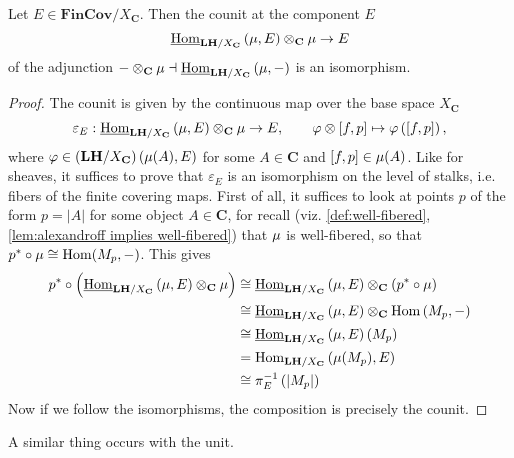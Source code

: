 \begin{proposition*}
\label{prop:the counit of the adjunction is an isomorphism}
Let $E \in \mathbf{FinCov}/X_{\mathbf{C}}$. Then the counit at the component $E$
\[ \underline{\operatorname{Hom}}_{\mathbf{LH}/X_{\mathbf{C}}}\left(\operatorname{\mu}, E\right) \otimes_{\mathbf{C}} \operatorname{\mu} \to E \]
of the adjunction $- \otimes_{\mathbf{C}} \operatorname{\mu} \dashv \underline{\operatorname{Hom}}_{\mathbf{LH}/X_{\mathbf{C}}}\left(\operatorname{\mu},-\right)$ is an isomorphism.
\end{proposition*}
\begin{proof}
The counit is given by the continuous map over the base space $X_{\mathbf{C}}$
\[ \varepsilon_E : \underline{\operatorname{Hom}}_{\mathbf{LH}/X_{\mathbf{C}}}\left(\operatorname{\mu}, E\right) \otimes_{\mathbf{C}} \operatorname{\mu} \to E, \qquad \varphi \otimes [f,p] \mapsto \varphi\left([f,p]\right), \]
where $\varphi \in \left(\mathbf{LH}/X_{\mathbf{C}}\right)(\operatorname{\mu}(A),E)$ for some $A \in \mathbf{C}$ and $[f,p] \in \operatorname{\mu}(A)$. Like for sheaves, it suffices to prove that $\varepsilon_E$ is an isomorphism on the level of stalks, i.e. fibers of the finite covering maps. First of all, it suffices to look at points $p$ of the form $p = |A|$ for some object $A \in \mathbf{C}$, for recall (viz. \cref{def:well-fibered}, \cref{lem:alexandroff implies well-fibered}) that $\operatorname{\mu}$ is well-fibered, so that $p^* \circ \operatorname{\mu} \cong \operatorname{Hom}(M_p,-)$. This gives
\begin{align*}
p^* \circ \left( \underline{\operatorname{Hom}}_{\mathbf{LH}/X_{\mathbf{C}}}\left(\operatorname{\mu}, E\right) \otimes_{\mathbf{C}} \operatorname{\mu} \right) 
&\cong \underline{\operatorname{Hom}}_{\mathbf{LH}/X_{\mathbf{C}}}\left(\operatorname{\mu}, E\right) \otimes_{\mathbf{C}} \left( p^* \circ \operatorname{\mu} \right) 
\\
&\cong \underline{\operatorname{Hom}}_{\mathbf{LH}/X_{\mathbf{C}}}\left(\operatorname{\mu}, E\right) \otimes_{\mathbf{C}} \operatorname{Hom}\left(M_p,-\right)
\\
&\cong \underline{\operatorname{Hom}}_{\mathbf{LH}/X_{\mathbf{C}}}\left(\operatorname{\mu}, E\right) \left(M_p \right) \\
&= \operatorname{Hom}_{\mathbf{LH}/X_{\mathbf{C}}}\left(\operatorname{\mu}(M_p), E\right) \\
&\cong \pi_E^{-1}\left(|M_p| \right)
\end{align*}
Now if we follow the isomorphisms, the composition is precisely the counit.
\end{proof}

A similar thing occurs with the unit.

